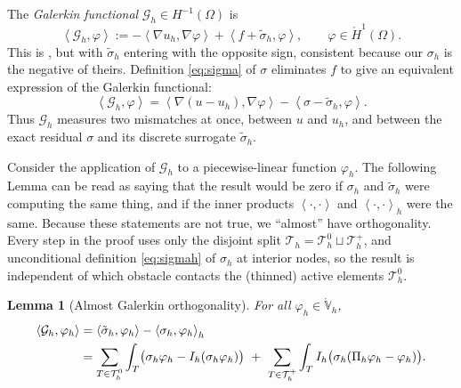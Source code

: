 \documentclass[12pt]{amsart}
\newtheorem{lemma}{Lemma}
\theoremstyle{definition}
\newcommand{\Om}{\Omega}
\newcommand{\Th}{\mathcal{T}_h}
\newcommand{\Vhr}{\mathring{\mathbb{V}}_h}
\newcommand{\Ih}{I_h}
\newcommand{\Pih}{\Pi_h}
\newcommand{\Thplus}{\Th^+}
\newcommand{\Thzero}{\Th^0}
\newcommand{\Gh}{\mathcal{G}_h}
\begin{document}
The \emph{Galerkin functional} $\Gh \in H^{-1}(\Om)$ is
\begin{equation}
\label{eq:Gh}
  \left<\Gh,\varphi\right> := -\left<\nabla u_h,\nabla\varphi\right> + \left< f + \tilde\sigma_h,\varphi\right>, \qquad \varphi \in \mathring H^1(\Om).
\end{equation}
This is \cite[formula (3.3)]{NSV03}, but with $\tilde\sigma_h$ entering with the opposite sign, consistent because our $\sigma_h$ is the negative of theirs.  Definition \eqref{eq:sigma} of $\sigma$ eliminates $f$ to give an equivalent expression of the Galerkin functional:
\begin{equation}
\label{eq:Ghagain}
\left<\Gh,\varphi\right> = \left<\nabla(u-u_h),\nabla\varphi\right> - \left<\sigma-\tilde\sigma_h,\varphi\right>.
\end{equation}
Thus $\Gh$ measures two mismatches at once, between $u$ and $u_h$, and between the exact residual $\sigma$ and its discrete surrogate $\tilde\sigma_h$.

Consider the application of $\Gh$ to a piecewise-linear function $\varphi_h$.  The following Lemma can be read as saying that the result would be zero if $\sigma_h$ and $\tilde \sigma_h$ were computing the same thing, and if the inner products $\left<\cdot,\cdot\right>$ and $\left<\cdot,\cdot\right>_h$ were the same.  Because these statements are not true, we ``almost'' have orthogonality.  Every step in the proof uses only the disjoint split $\Th = \Thzero \sqcup \Thplus$, and unconditional definition \eqref{eq:sigmah} of $\sigma_h$ at interior nodes, so the result is independent of which obstacle contacts the (thinned) active elements $\Thzero$.

\begin{lemma}[Almost Galerkin orthogonality]
\label{lem:almostGO}
For all $\varphi_h \in \Vhr$,
\begin{align}
\label{eq:almostGO}
  \left< \Gh, \varphi_h\right> &= \left<\tilde\sigma_h,\varphi_h\right> - \left< \sigma_h,\varphi_h\right>_h \\
  &= \sum_{T\in\Thzero}\int_T \bigl(\sigma_h\varphi_h - \Ih(\sigma_h\varphi_h)\bigr)
  \ +\ \sum_{T\in\Thplus}\int_T \Ih\bigl(\sigma_h(\Pih\varphi_h - \varphi_h)\bigr). \notag
\end{align}
\end{lemma}
\end{document}
